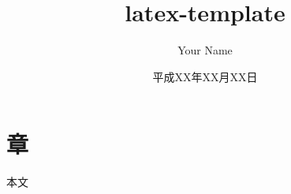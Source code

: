 \documentclass{jarticle}
\title{latex-template}
\author{Your Name}
\date{平成XX年XX月XX日}
\begin{document}
\maketitle

\section{章}
本文\cite{LaTeX}



\end{document}
